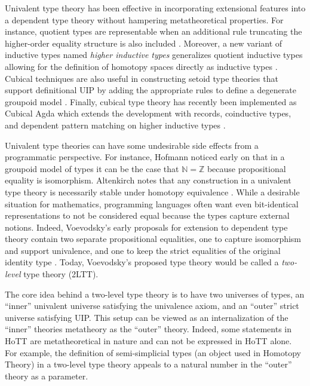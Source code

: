 Univalent type theory has been effective in incorporating extensional features into a dependent type theory without hampering metatheoretical properties.
For instance, quotient types are representable when an additional rule truncating the higher-order equality structure is also included \cite{kraus2020}.
Moreover, a new variant of inductive types named \textit{higher inductive types} generalizes quotient inductive types allowing for the definition of homotopy spaces directly as inductive types \cite{angiuli2017}.
Cubical techniques are also useful in constructing setoid type theories that support definitional UIP by adding the appropriate rules to define a degenerate groupoid model \cite{sterling2020}.
Finally, cubical type theory has recently been implemented as Cubical Agda which extends the development with records, coinductive types, and dependent pattern matching on higher inductive types \cite{vezzosi2021}.

Univalent type theories can have some undesirable side effects from a programmatic perspective.
For instance, Hofmann noticed early on that in a groupoid model of types it can be the case that $\mathbb{N} = \mathbb{Z}$ because propositional equality is isomorphism.
Altenkirch notes that any construction in a univalent type theory is necessarily stable under homotopy equivalence \cite{altenkirch2016}.
While a desirable situation for mathematics, programming languages often want even bit-identical representations to not be considered equal because the types capture external notions.
Indeed, Voevodsky's early proposals for extension to dependent type theory contain two separate propositional equalities, one to capture isomorphism and support univalence, and one to keep the strict equalities of the original identity type \cite{voevodsky2013}.
Today, Voevodsky's proposed type theory would be called a \textit{two-level} type theory (2LTT).

The core idea behind a two-level type theory is to have two universes of types, an ``inner'' univalent universe satisfying the univalence axiom, and an ``outer'' strict universe satisfying UIP.
This setup can be viewed as an internalization of the ``inner'' theories metatheory as the ``outer'' theory.
Indeed, some statements in HoTT are metatheoretical in nature and can not be expressed in HoTT alone.
For example, the definition of semi-simplicial types (an object used in Homotopy Theory) in a two-level type theory appeals to a natural number in the ``outer'' theory as a parameter.

